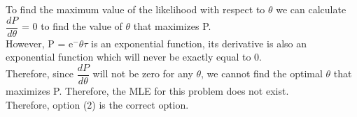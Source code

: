 \documentclass[12pt]{article}
\begin{document}
\noindent To find the maximum value of the likelihood with respect to $\theta$ we can calculate $\dfrac{dP}{d\theta}$ = 0 to find the value of $\theta$ that maximizes P.
\\

\noindent However, P = e$^-\theta \tau$ is an exponential function, its derivative is also an exponential function which will never be exactly equal to 0. 
\\

\noindent Therefore, since $\dfrac{dP}{d\theta}$ will not be zero for any $\theta$, we cannot find the optimal $\theta$ that maximizes P. Therefore, the MLE for this problem does not exist.
\\

\noindent Therefore, option (2) is the correct option.
\end{document}
